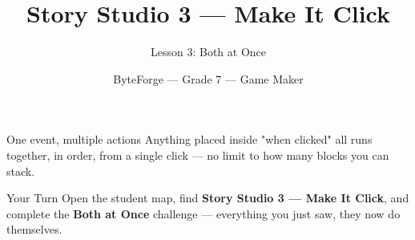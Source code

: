 \documentclass[aspectratio=169]{beamer}
\title{Story Studio 3 — Make It Click}
\subtitle{Lesson 3: Both at Once}
\author{ByteForge --- Grade 7 --- Game Maker}
\date{}
\begin{document}
\begin{frame}
    \titlepage
\end{frame}

\begin{frame}{One event, multiple actions}
    \Large
    Anything placed inside "when clicked" all runs together, in order, from a single click — no limit to how many blocks you can stack.
\end{frame}

\begin{frame}{Your Turn}
    \Large
    Open the student map, find \textbf{Story Studio 3 — Make It Click}, and complete
    the \textbf{Both at Once} challenge --- everything you just saw, they now do themselves.
\end{frame}
\end{document}
